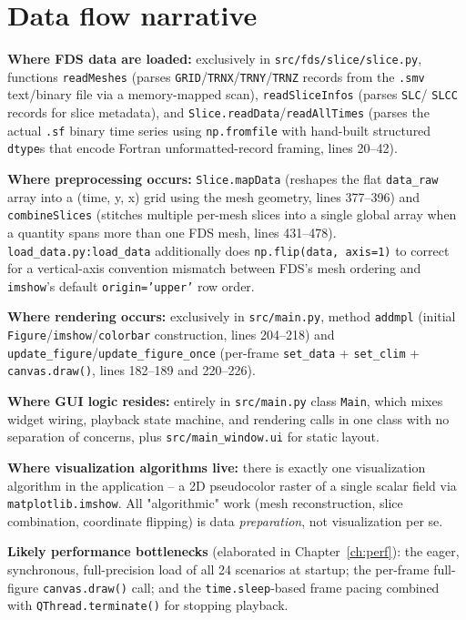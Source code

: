 \documentclass[11pt,a4paper]{report}
\begin{document}
\section{Data flow narrative}

\begin{factbox}
\textbf{Where FDS data are loaded:} exclusively in \texttt{src/fds/slice/slice.py}, functions
\texttt{readMeshes} (parses \texttt{GRID}/\texttt{TRNX}/\texttt{TRNY}/\texttt{TRNZ} records from the
\texttt{.smv} text/binary file via a memory-mapped scan), \texttt{readSliceInfos} (parses \texttt{SLC}/
\texttt{SLCC} records for slice metadata), and \texttt{Slice.readData}/\texttt{readAllTimes} (parses
the actual \texttt{.sf} binary time series using \texttt{np.fromfile} with hand-built structured
\texttt{dtype}s that encode Fortran unformatted-record framing, lines 20--42).

\textbf{Where preprocessing occurs:} \texttt{Slice.mapData} (reshapes the flat \texttt{data\_raw}
array into a (time, y, x) grid using the mesh geometry, lines 377--396) and \texttt{combineSlices}
(stitches multiple per-mesh slices into a single global array when a quantity spans more than one
FDS mesh, lines 431--478). \texttt{load\_data.py:load\_data} additionally does \texttt{np.flip(data,
axis=1)} to correct for a vertical-axis convention mismatch between FDS's mesh ordering and
\texttt{imshow}'s default \texttt{origin='upper'} row order.

\textbf{Where rendering occurs:} exclusively in \texttt{src/main.py}, method \texttt{addmpl} (initial
\texttt{Figure}/\texttt{imshow}/\texttt{colorbar} construction, lines 204--218) and
\texttt{update\_figure}/\texttt{update\_figure\_once} (per-frame \texttt{set\_data} + \texttt{set\_clim}
+ \texttt{canvas.draw()}, lines 182--189 and 220--226).

\textbf{Where GUI logic resides:} entirely in \texttt{src/main.py} class \texttt{Main}, which mixes
widget wiring, playback state machine, and rendering calls in one class with no separation of
concerns, plus \texttt{src/main\_window.ui} for static layout.

\textbf{Where visualization algorithms live:} there is exactly one visualization algorithm in the
application -- a 2D pseudocolor raster of a single scalar field via \texttt{matplotlib.imshow}. All
"algorithmic" work (mesh reconstruction, slice combination, coordinate flipping) is data
\emph{preparation}, not visualization per se.

\textbf{Likely performance bottlenecks} (elaborated in Chapter~\ref{ch:perf}): the eager, synchronous,
full-precision load of all 24 scenarios at startup; the per-frame full-figure \texttt{canvas.draw()}
call; and the \texttt{time.sleep}-based frame pacing combined with \texttt{QThread.terminate()} for
stopping playback.
\end{factbox}
\end{document}
